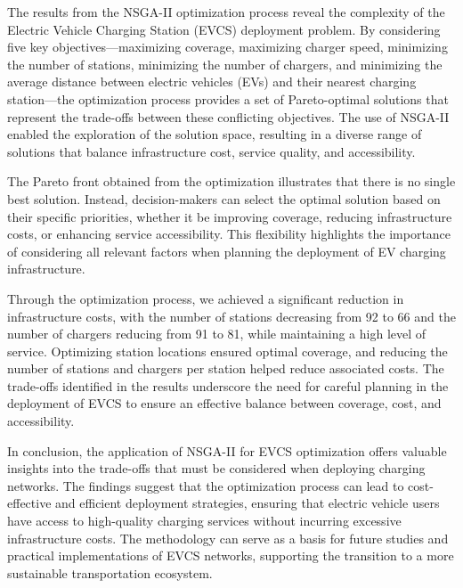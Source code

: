 The results from the NSGA-II optimization process reveal the complexity of the Electric Vehicle Charging Station (EVCS) deployment problem. By considering five key objectives—maximizing coverage, maximizing charger speed, minimizing the number of stations, minimizing the number of chargers, and minimizing the average distance between electric vehicles (EVs) and their nearest charging station—the optimization process provides a set of Pareto-optimal solutions that represent the trade-offs between these conflicting objectives. The use of NSGA-II enabled the exploration of the solution space, resulting in a diverse range of solutions that balance infrastructure cost, service quality, and accessibility.

The Pareto front obtained from the optimization illustrates that there is no single best solution. Instead, decision-makers can select the optimal solution based on their specific priorities, whether it be improving coverage, reducing infrastructure costs, or enhancing service accessibility. This flexibility highlights the importance of considering all relevant factors when planning the deployment of EV charging infrastructure.

Through the optimization process, we achieved a significant reduction in infrastructure costs, with the number of stations decreasing from 92 to 66 and the number of chargers reducing from 91 to 81, while maintaining a high level of service. Optimizing station locations ensured optimal coverage, and reducing the number of stations and chargers per station helped reduce associated costs. The trade-offs identified in the results underscore the need for careful planning in the deployment of EVCS to ensure an effective balance between coverage, cost, and accessibility.

In conclusion, the application of NSGA-II for EVCS optimization offers valuable insights into the trade-offs that must be considered when deploying charging networks. The findings suggest that the optimization process can lead to cost-effective and efficient deployment strategies, ensuring that electric vehicle users have access to high-quality charging services without incurring excessive infrastructure costs. The methodology can serve as a basis for future studies and practical implementations of EVCS networks, supporting the transition to a more sustainable transportation ecosystem.
